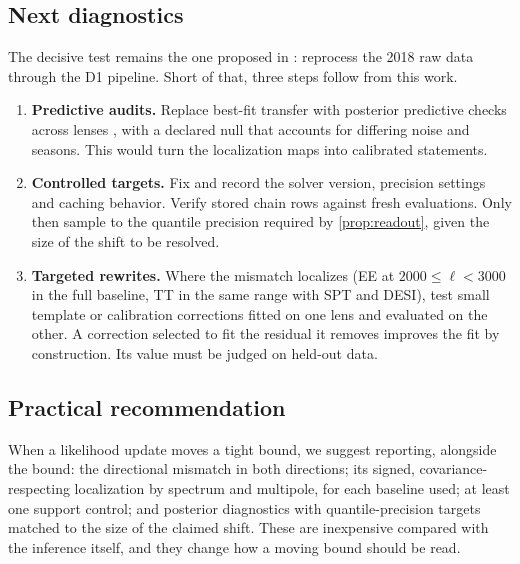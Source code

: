 \subsection{Next diagnostics}
The decisive test remains the one proposed in \cite{arxiv2601_16277}: reprocess the 2018 raw data through the D1 pipeline. Short of that, three steps follow from this work.
\begin{enumerate}[leftmargin=*, itemsep=2pt]
  \item \textbf{Predictive audits.} Replace best-fit transfer with posterior predictive checks across lenses \cite{gelman_meng_stern1996_ppc}, with a declared null that accounts for differing noise and seasons. This would turn the localization maps into calibrated statements.
  \item \textbf{Controlled targets.} Fix and record the solver version, precision settings and caching behavior. Verify stored chain rows against fresh evaluations. Only then sample to the quantile precision required by \cref{prop:readout}, given the size of the shift to be resolved.
  \item \textbf{Targeted rewrites.} Where the mismatch localizes (EE at $2000\le\ell<3000$ in the full baseline, TT in the same range with SPT and DESI), test small template or calibration corrections fitted on one lens and evaluated on the other. A correction selected to fit the residual it removes improves the fit by construction. Its value must be judged on held-out data.
\end{enumerate}

\subsection{Practical recommendation}
When a likelihood update moves a tight bound, we suggest reporting, alongside the bound: the directional mismatch in both directions; its signed, covariance-respecting localization by spectrum and multipole, for each baseline used; at least one support control; and posterior diagnostics with quantile-precision targets matched to the size of the claimed shift. These are inexpensive compared with the inference itself, and they change how a moving bound should be read.
